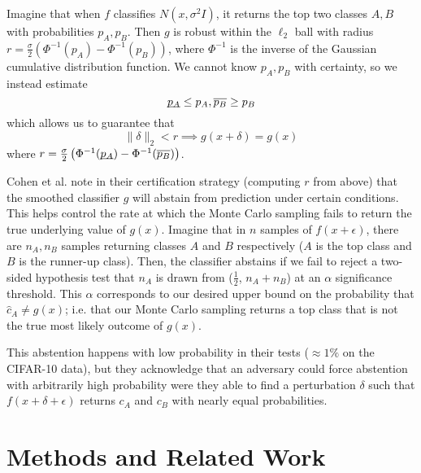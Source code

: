\documentclass{article}
\begin{document}
Imagine that when $f$ classifies $N(x, \sigma^2 I)$, it returns the top two classes $A, B$ with probabilities $p_A, p_B$. Then $g$ is robust within the $\ell_2$ ball with radius $r = \frac{\sigma}{2} \left( \Phi^{-1}(p_A) - \Phi^{-1}(p_B) \right)$, where $\Phi^{-1}$ is the inverse of the Gaussian cumulative distribution function. We cannot know $p_A,p_B$ with certainty, so we instead estimate
\[ \underbar{$p_A$} \leq p_A, \overline{p_B} \geq p_B \]
which allows us to guarantee that
\[ \| \delta \|_2 < r \implies g(x + \delta) = g(x) \]
where $r = \frac{\sigma}{2} \left( \Phi^{-1}(\underbar{$p_A$}) - \Phi^{-1}(\overline{p_B}) \right)$. \newline

Cohen et al. note in their certification strategy (computing $r$ from above) that the smoothed classifier $g$ will abstain from prediction under certain conditions. This helps control the rate at which the Monte Carlo sampling fails to return the true underlying value of $g(x)$. Imagine that in $n$ samples of $f(x + \epsilon)$, there are $n_A,n_B$ samples returning classes $A$ and $B$ respectively ($A$ is the top class and $B$ is the runner-up class). Then, the classifier abstains if we fail to reject a two-sided hypothesis test that $n_A$ is drawn from ($\frac{1}{2}$, $n_A + n_B$) at an $\alpha$ significance threshold. This $\alpha$ corresponds to our desired upper bound on the probability that $\hat{c}_A \neq g(x)$; i.e. that our Monte Carlo sampling returns a top class that is not the true most likely outcome of $g(x)$. \newline

This abstention happens with low probability in their tests ($\approx 1\%$ on the CIFAR-10 data), but they acknowledge that an adversary could force abstention with arbitrarily high probability were they able to find a perturbation $\delta$ such that $f(x + \delta + \epsilon)$ returns $c_A$ and $c_B$ with nearly equal probabilities.

\section{Methods and Related Work}
\end{document}
